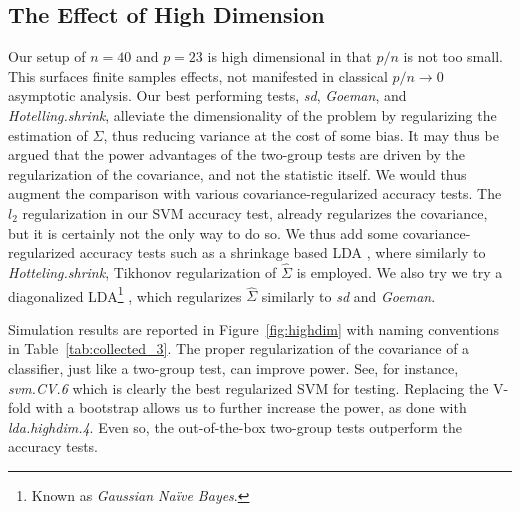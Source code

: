 \documentclass[journal]{IEEEtran}
\begin{document}
\subsection{The Effect of High Dimension}
\label{sec:highdim}

Our setup of $n=40$ and $p=23$ is high dimensional in that $p/n$ is not too small. 
This surfaces finite samples effects, not manifested in classical $p/n \to 0$ asymptotic analysis.
Our best performing tests, \emph{sd}, \emph{Goeman}, and \emph{Hotelling.shrink}, alleviate the dimensionality of the problem by regularizing the estimation of $\Sigma$, thus reducing variance at the cost of some bias. 
It may thus be argued that the power advantages of the two-group tests are driven by the regularization of the covariance, and not the statistic itself.
We would thus augment the comparison with various covariance-regularized accuracy tests.
The $l_2$ regularization in our SVM accuracy test, already regularizes the covariance, but it is certainly not the only way to do so. 
We thus add some covariance-regularized accuracy tests such as a shrinkage based LDA \cite{pang_shrinkage-based_2009,ramey_high-dimensional_2016}, where similarly to \emph{Hotteling.shrink}, Tikhonov regularization of $\hat \Sigma$ is employed. 
We also try we try a diagonalized LDA\footnote{Known as \emph{Gaussian Na\"ive Bayes}.} \cite{dudoit_comparison_2002}, which regularizes $\hat{\Sigma}$ similarly to \emph{sd} and \emph{Goeman}.

Simulation results are reported in Figure~\ref{fig:highdim} with naming conventions in Table~\ref{tab:collected_3}.
The proper regularization of the covariance of a classifier, just like a two-group test, can improve power. 
See, for instance, \emph{svm.CV.6} which is clearly the best regularized SVM for testing. 
Replacing the V-fold  with a bootstrap allows us to further increase the power, as done with \emph{lda.highdim.4}.
Even so, the out-of-the-box two-group tests outperform the accuracy tests.

\bigskip
\end{document}
